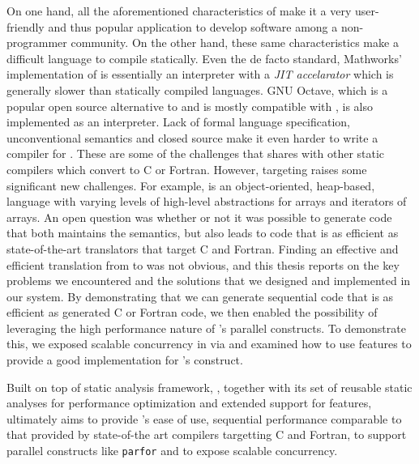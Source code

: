 On one hand, all the aforementioned characteristics of \matlab make it a very
user-friendly and thus popular application to develop software among a
non-programmer community. On the other hand, these same characteristics make
\matlab a difficult language to compile statically. Even the de facto standard,
Mathworks' implementation of \matlab is essentially an interpreter with a
\emph{JIT accelarator}\cite{matlabjit} which is generally slower than statically
compiled languages. GNU Octave, which is a popular open source alternative to
\matlab and is mostly compatible with \matlab, is also implemented as an
interpreter\cite{Octave}.  Lack of formal language specification, unconventional
semantics and closed source make it even harder to write a compiler for \matlab.
These are some of the challenges that \mixten shares with other static compilers
which convert \matlab to C or Fortran. However, targeting \xten
raises some significant new challenges.   For example, \xten is an
object-oriented,  heap-based, language with varying levels of high-level
abstractions for arrays and iterators of arrays.     An open question
was whether or not it was possible to generate \xten code that both
maintains the \matlab semantics,  but also leads to code that is as
efficient as state-of-the-art translators that target C and Fortran.
Finding an effective and efficient translation from \matlab to \xten was
not obvious, and this thesis reports on the key problems we encountered
and the solutions that we designed and implemented in our \mixten system.
By demonstrating that we can generate sequential \xten code that is as
efficient as generated C or Fortran code,  we then enabled the
possibility of leveraging the high performance nature of \xten's parallel
constructs.   To demonstrate this, we exposed scalable concurrency in \matlab
via \xten and examined how to use \xten features
to provide a good implementation for \matlab's \parfor construct.

Built on top of \mclab static analysis framework\cite{JesseThesis, TamerPaper},
\mixten, together with its set of reusable static analyses for performance
optimization and extended support for \matlab features, ultimately aims to
provide \matlab's ease of use, sequential performance comparable to that
provided by state-of-the art compilers targetting C and Fortran, to support
parallel constructs like \texttt{parfor} and to expose scalable concurrency.  

